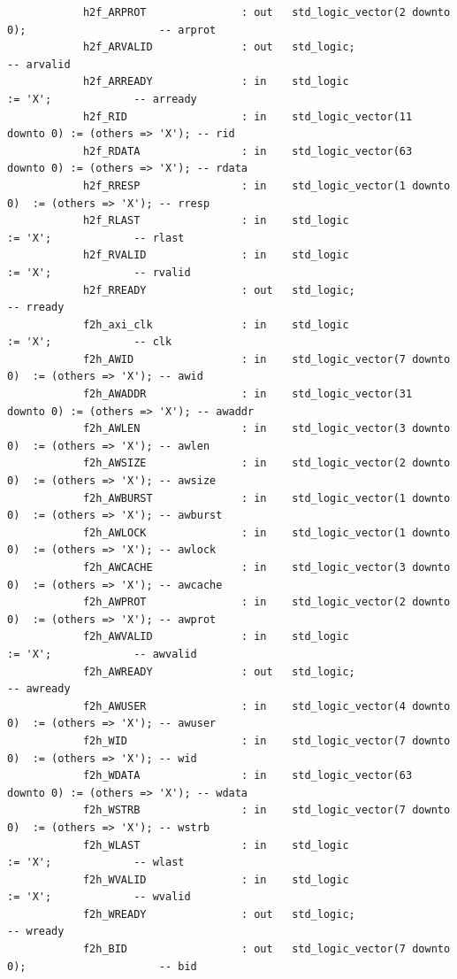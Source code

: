 \documentclass[conference]{IEEEtran}
\begin{document}
\begin{lstlisting}
			h2f_ARPROT               : out   std_logic_vector(2 downto 0);                     -- arprot
			h2f_ARVALID              : out   std_logic;                                        -- arvalid
			h2f_ARREADY              : in    std_logic                     := 'X';             -- arready
			h2f_RID                  : in    std_logic_vector(11 downto 0) := (others => 'X'); -- rid
			h2f_RDATA                : in    std_logic_vector(63 downto 0) := (others => 'X'); -- rdata
			h2f_RRESP                : in    std_logic_vector(1 downto 0)  := (others => 'X'); -- rresp
			h2f_RLAST                : in    std_logic                     := 'X';             -- rlast
			h2f_RVALID               : in    std_logic                     := 'X';             -- rvalid
			h2f_RREADY               : out   std_logic;                                        -- rready
			f2h_axi_clk              : in    std_logic                     := 'X';             -- clk
			f2h_AWID                 : in    std_logic_vector(7 downto 0)  := (others => 'X'); -- awid
			f2h_AWADDR               : in    std_logic_vector(31 downto 0) := (others => 'X'); -- awaddr
			f2h_AWLEN                : in    std_logic_vector(3 downto 0)  := (others => 'X'); -- awlen
			f2h_AWSIZE               : in    std_logic_vector(2 downto 0)  := (others => 'X'); -- awsize
			f2h_AWBURST              : in    std_logic_vector(1 downto 0)  := (others => 'X'); -- awburst
			f2h_AWLOCK               : in    std_logic_vector(1 downto 0)  := (others => 'X'); -- awlock
			f2h_AWCACHE              : in    std_logic_vector(3 downto 0)  := (others => 'X'); -- awcache
			f2h_AWPROT               : in    std_logic_vector(2 downto 0)  := (others => 'X'); -- awprot
			f2h_AWVALID              : in    std_logic                     := 'X';             -- awvalid
			f2h_AWREADY              : out   std_logic;                                        -- awready
			f2h_AWUSER               : in    std_logic_vector(4 downto 0)  := (others => 'X'); -- awuser
			f2h_WID                  : in    std_logic_vector(7 downto 0)  := (others => 'X'); -- wid
			f2h_WDATA                : in    std_logic_vector(63 downto 0) := (others => 'X'); -- wdata
			f2h_WSTRB                : in    std_logic_vector(7 downto 0)  := (others => 'X'); -- wstrb
			f2h_WLAST                : in    std_logic                     := 'X';             -- wlast
			f2h_WVALID               : in    std_logic                     := 'X';             -- wvalid
			f2h_WREADY               : out   std_logic;                                        -- wready
			f2h_BID                  : out   std_logic_vector(7 downto 0);                     -- bid

\end{lstlisting}
\end{document}
